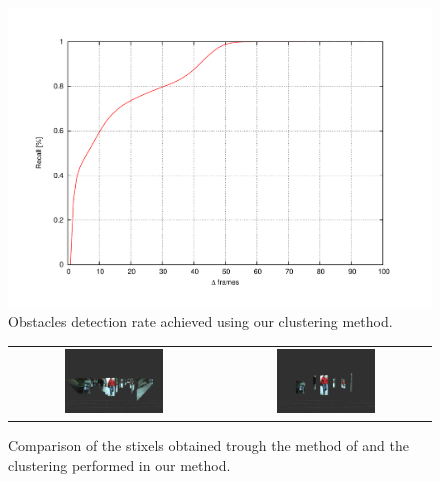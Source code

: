 \begin{figure}[h!]
\centering
\includegraphics[trim=50 40 80 60,clip]{detectionRate}
\caption{Obstacles detection rate achieved using our clustering method.}\label{fig:cp04_detection_rate}
\end{figure}

\begin{figure}[h!]
\begin{tabular}{cc}
\includegraphics[width=0.49\textwidth]{stixelsDetection}\label{fig:cp04_stixels_detection} &
\includegraphics[width=0.49\textwidth]{obstacleDetection}\label{fig:cp04_obstacle_detection}
\end{tabular}
\caption{Comparison of the stixels obtained trough the method of \cite{benenson2012fast} and the clustering performed in our method.}\label{fig:cp04_clustering_comparison}
\end{figure}

